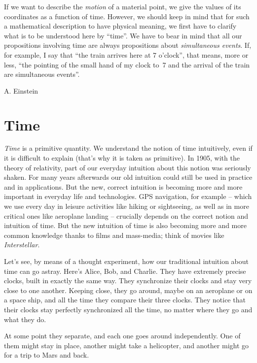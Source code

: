 \documentclass[a4paper,12pt,%
onecolumn,oneside,titlepage,%
british%
]{memoir}
\providecommand{\href}[2]{#2}
\renewcommand*{\|}[1][]{\nonscript\:#1\vert\nonscript\:\mathopen{}}
\newcommand*{\furl}[2]{\href{#1}{#2}\pagenote{\url{#1}}}
\begin{document}
\epigraph{If we want to describe the \emph{motion} of a material point, we give the values of its coordinates as a function of time. However, we should keep in mind that for such a mathematical description to have physical meaning, we first have to clarify what is to be understood here by \enquote{time}. We have to bear in mind that all our propositions involving time are always propositions about \emph{simultaneous events}. If, for example, I say that \enquote{the train arrives here at 7 o'clock}, that means, more or less, \enquote{the pointing of the small hand of my clock to~7 and the arrival of the train are simultaneous events}.}{A. Einstein \cites*{einstein1905c}}

\section{Time}
\label{sec:time}

\emph{Time} is a primitive quantity. We understand the notion of time intuitively, even if it is difficult to explain (that's why it is taken as primitive). In 1905, with the theory of relativity, part of our everyday intuition about this notion was seriously shaken. For many years afterwards our old intuition could still be used in practice and in applications. But the new, correct intuition is becoming more and more important in everyday life and technologies. GPS navigation, for example -- which we use every day in leisure activities like hiking or sightseeing, as well as in more critical ones like aeroplane landing -- crucially depends on the correct notion and intuition of time. But the new intuition of time is also becoming more and more common knowledge thanks to films and mass-media; think of movies like \furl{https://www.imdb.com/title/tt0816692/}{\emph{Interstellar}}.

Let's see, by means of a thought experiment, how our traditional intuition about time can go astray. Here's Alice, Bob, and Charlie. They have extremely precise clocks, built in exactly the same way. They synchronize their clocks and stay very close to one another. Keeping close, they go around, maybe on an aeroplane or on a space ship, and all the time they compare their three clocks. They notice that their clocks stay perfectly synchronized all the time, no matter where they go and what they do.

At some point they separate, and each one goes around independently. One of them might stay in place, another might take a helicopter, and another might go for a trip to Mars and back.
\end{document}
